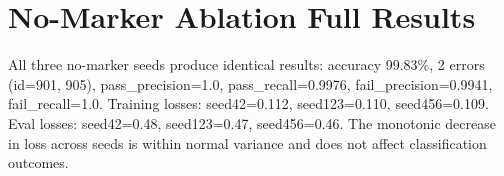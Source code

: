 \documentclass[11pt,a4paper]{article}
\begin{document}
\section{No-Marker Ablation Full Results}
\label{app:nomarker}

All three no-marker seeds produce identical results: accuracy 99.83\%, 2 errors (id=901, 905), pass\_precision=1.0, pass\_recall=0.9976, fail\_precision=0.9941, fail\_recall=1.0. Training losses: seed42=0.112, seed123=0.110, seed456=0.109. Eval losses: seed42=0.48, seed123=0.47, seed456=0.46. The monotonic decrease in loss across seeds is within normal variance and does not affect classification outcomes.
\end{document}

